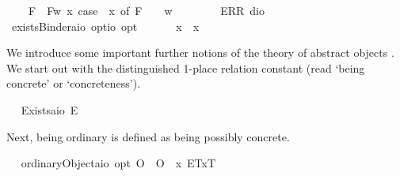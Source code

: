 \begin{isabellebody}
\ \ \ \ F{\isacharparenleft}{\isacharunderscore}{\isacharparenright}\ {\isasymRightarrow}\ F{\isacharparenleft}{\isasymlambda}w{\isachardot}\ {\isasymexists}x{\isachardot}\ case\ {\isacharparenleft}{\isasymPhi}\ x{\isacharparenright}\ of\ F\ {\isasympsi}\ {\isasymRightarrow}\ {\isasympsi}\ w{\isacharparenright}\ {\isacharbar}\ \isanewline
\ \ \ \ {\isacharunderscore}\ {\isasymRightarrow}\ ERR\ dio{\isachardoublequoteclose}\ \isanewline
\ \isamarkupfalse%
\ existsBinder{\isacharcolon}{\isacharcolon}{\isachardoublequoteopen}{\isacharparenleft}{\isacharprime}a{\isasymRightarrow}io\ opt{\isacharparenright}{\isasymRightarrow}io\ opt{\isachardoublequoteclose}\ {\isacharparenleft}\ {\isachardoublequoteopen}\isactrlbold {\isasymexists}{\isachardoublequoteclose}\ {\isacharbrackleft}{}{\isacharbrackright}\ {}{\isacharparenright}\ \ \ {\isachardoublequoteopen}\isactrlbold {\isasymexists}x{\isachardot}\ {\isasymphi}\ x\ {\isasymequiv}\ \isactrlbold {\isasymexists}{\isasymphi}{\isachardoublequoteclose}%
\isamarkuptrue%
%
\begin{isamarkuptext}%
We introduce some important further notions of the theory of abstract objects \cite{zalta83:_abstr_objec}. We 
  start out with the distinguished 1-place relation constant  (read ‘being concrete’ or ‘concreteness’).%
\end{isamarkuptext}\isamarkuptrue%
\ \isamarkupfalse%
\ Exists{\isacharcolon}{\isacharcolon}{\isachardoublequoteopen}{\isacharparenleft}{\isacharprime}a{\isasymRightarrow}io{\isacharparenright}{\isachardoublequoteclose}\ {\isacharparenleft}{\isachardoublequoteopen}E{\isacharbang}{\isachardoublequoteclose}{\isacharparenright}%
\begin{isamarkuptext}%
Next, being ordinary is defined as being possibly concrete.%
\end{isamarkuptext}\isamarkuptrue%
\ \isamarkupfalse%
\ ordinaryObject{\isacharcolon}{\isacharcolon}{\isachardoublequoteopen}{\isacharparenleft}{\isacharprime}a{\isasymRightarrow}io{\isacharparenright}\ opt{\isachardoublequoteclose}\ {\isacharparenleft}{\isachardoublequoteopen}O{\isacharbang}{\isachardoublequoteclose}{\isacharparenright}\ \ {\isachardoublequoteopen}O{\isacharbang}\ {\isasymequiv}\ \isactrlbold {\isasymlambda}x{\isachardot}\ \isactrlbold {\isasymdiamond}{\isasymlparr}E{\isacharbang}\isactrlsup T{\isacharcomma}x\isactrlsup T{\isasymrparr}{\isachardoublequoteclose}%

\end{isabellebody}
